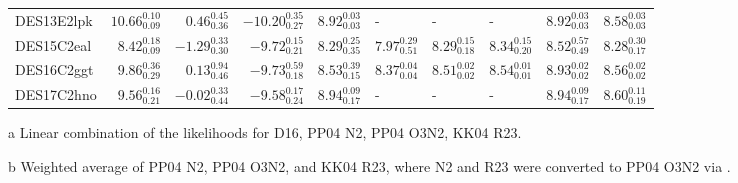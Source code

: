 \documentclass[fleqn,usenatbib,]{mnras}
\begin{document}
\begin{table}
\begin{threeparttable}
\begin{tabular}{lrrrllllll}
DES13E2lpk &  $10.66 _{\scriptscriptstyle 0.09} ^{\scriptscriptstyle 0.10}$ &   $0.46 _{\scriptscriptstyle 0.36} ^{\scriptscriptstyle 0.45}$ &  $-10.20 _{\scriptscriptstyle 0.27} ^{\scriptscriptstyle 0.35}$ &  $8.92 _{\scriptscriptstyle 0.03} ^{\scriptscriptstyle 0.03}$ &                                                             - &                                                             - &                                                             - &  $8.92 _{\scriptscriptstyle 0.03} ^{\scriptscriptstyle 0.03}$ &   $8.58 _{\scriptscriptstyle 0.03} ^{\scriptscriptstyle 0.03}$ \\
DES15C2eal &   $8.42 _{\scriptscriptstyle 0.09} ^{\scriptscriptstyle 0.18}$ &  $-1.29 _{\scriptscriptstyle 0.30} ^{\scriptscriptstyle 0.33}$ &   $-9.72 _{\scriptscriptstyle 0.21} ^{\scriptscriptstyle 0.15}$ &  $8.29 _{\scriptscriptstyle 0.35} ^{\scriptscriptstyle 0.25}$ &  $7.97 _{\scriptscriptstyle 0.51} ^{\scriptscriptstyle 0.29}$ &  $8.29 _{\scriptscriptstyle 0.18} ^{\scriptscriptstyle 0.15}$ &  $8.34 _{\scriptscriptstyle 0.20} ^{\scriptscriptstyle 0.15}$ &  $8.52 _{\scriptscriptstyle 0.49} ^{\scriptscriptstyle 0.57}$ &   $8.28 _{\scriptscriptstyle 0.17} ^{\scriptscriptstyle 0.30}$ \\
DES16C2ggt &   $9.86 _{\scriptscriptstyle 0.29} ^{\scriptscriptstyle 0.36}$ &   $0.13 _{\scriptscriptstyle 0.46} ^{\scriptscriptstyle 0.94}$ &   $-9.73 _{\scriptscriptstyle 0.18} ^{\scriptscriptstyle 0.59}$ &  $8.53 _{\scriptscriptstyle 0.15} ^{\scriptscriptstyle 0.39}$ &  $8.37 _{\scriptscriptstyle 0.04} ^{\scriptscriptstyle 0.04}$ &  $8.51 _{\scriptscriptstyle 0.02} ^{\scriptscriptstyle 0.02}$ &  $8.54 _{\scriptscriptstyle 0.01} ^{\scriptscriptstyle 0.01}$ &  $8.93 _{\scriptscriptstyle 0.02} ^{\scriptscriptstyle 0.02}$ &   $8.56 _{\scriptscriptstyle 0.02} ^{\scriptscriptstyle 0.02}$ \\
DES17C2hno &   $9.56 _{\scriptscriptstyle 0.21} ^{\scriptscriptstyle 0.16}$ &  $-0.02 _{\scriptscriptstyle 0.44} ^{\scriptscriptstyle 0.33}$ &   $-9.58 _{\scriptscriptstyle 0.24} ^{\scriptscriptstyle 0.17}$ &  $8.94 _{\scriptscriptstyle 0.17} ^{\scriptscriptstyle 0.09}$ &                                                             - &                                                             - &                                                             - &  $8.94 _{\scriptscriptstyle 0.17} ^{\scriptscriptstyle 0.09}$ &   $8.60 _{\scriptscriptstyle 0.19} ^{\scriptscriptstyle 0.11}$ \\

\bottomrule
\end{tabular}
\begin{tablenotes}
\item[a] Linear combination of the likelihoods for D16, PP04 N2, PP04 O3N2, KK04 R23.
\item[b] Weighted average of PP04 N2, PP04 O3N2, and KK04 R23, where N2 and R23 were converted to PP04 O3N2 via \citet{Kewley2008}.

\end{tablenotes}
\end{threeparttable}
\label{tab:derived}
\end{table}
\end{document}
